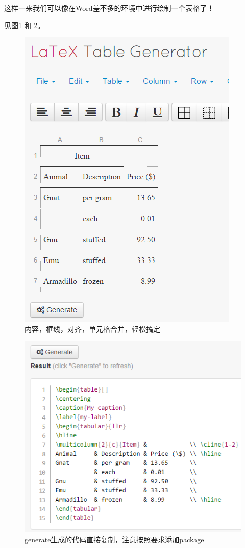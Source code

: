 \documentclass[12pt,a4paper,oneside]{book}
\begin{document}
{\par
这样一来我们可以像在Word差不多的环境中进行绘制一个表格了！
\par
见图\ref{pic:tb} 和 \ref{pic:tb2}。
\par
\begin{figure}[htp] 
\centering 
\includegraphics[scale=0.65]{tb.png}
\caption{内容，框线，对齐，单元格合并，轻松搞定~}%
\label{pic:tb}
\end{figure}

\par
\begin{figure}[htp] 
\centering 
\includegraphics[scale=0.65]{tb2.png}
\caption{generate生成的代码直接复制，注意按照要求添加package}%
\label{pic:tb2}
\end{figure}

}
\end{document}
